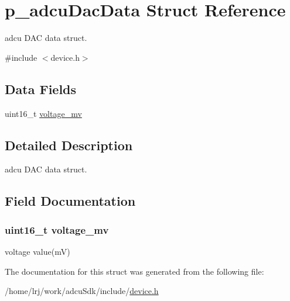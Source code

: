 \hypertarget{structp__adcuDacData}{}\section{p\+\_\+adcu\+Dac\+Data Struct Reference}
\label{structp__adcuDacData}


adcu D\+AC data struct.  




{\ttfamily \#include $<$device.\+h$>$}

\subsection*{Data Fields}
\begin{DoxyCompactItemize}
\item 
uint16\+\_\+t \hyperlink{structp__adcuDacData_a07ff6e86637a4540af822541b93abb00}{voltage\+\_\+mv}
\end{DoxyCompactItemize}


\subsection{Detailed Description}
adcu D\+AC data struct. 

\subsection{Field Documentation}
\subsubsection[{\texorpdfstring{voltage\+\_\+mv}{voltage_mv}}]{\setlength{\rightskip}{0pt plus 5cm}uint16\+\_\+t voltage\+\_\+mv}\hypertarget{structp__adcuDacData_a07ff6e86637a4540af822541b93abb00}{}\label{structp__adcuDacData_a07ff6e86637a4540af822541b93abb00}
voltage value(m\+V) 

The documentation for this struct was generated from the following file\+:\begin{DoxyCompactItemize}
\item 
/home/lrj/work/adcu\+Sdk/include/\hyperlink{device_8h}{device.\+h}\end{DoxyCompactItemize}
